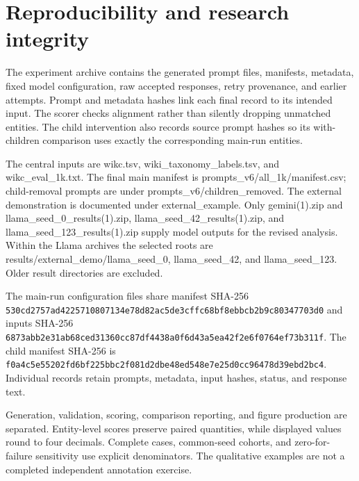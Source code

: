 \chapter{Reproducibility and research integrity}

The experiment archive contains the generated prompt files, manifests, metadata, fixed model configuration, raw accepted responses, retry provenance, and earlier attempts. Prompt and metadata hashes link each final record to its intended input. The scorer checks alignment rather than silently dropping unmatched entities. The child intervention also records source prompt hashes so its with-children comparison uses exactly the corresponding main-run entities.


The central inputs are wikc.tsv, wiki\_\allowbreak{}taxonomy\_\allowbreak{}labels.tsv, and wikc\_\allowbreak{}eval\_\allowbreak{}1k.txt. The final main manifest is prompts\_\allowbreak{}v6/all\_\allowbreak{}1k/manifest.csv; child-removal prompts are under prompts\_\allowbreak{}v6/children\_\allowbreak{}removed. The external demonstration is documented under external\_\allowbreak{}example. Only gemini(1).zip and llama\_\allowbreak{}seed\_\allowbreak{}0\_\allowbreak{}results(1).zip, llama\_\allowbreak{}seed\_\allowbreak{}42\_\allowbreak{}results(1).zip, and llama\_\allowbreak{}seed\_\allowbreak{}123\_\allowbreak{}results(1).zip supply model outputs for the revised analysis. Within the Llama archives the selected roots are results/external\_\allowbreak{}demo/llama\_\allowbreak{}seed\_\allowbreak{}0, llama\_\allowbreak{}seed\_\allowbreak{}42, and llama\_\allowbreak{}seed\_\allowbreak{}123. Older result directories are excluded.


{\small The main-run configuration files share manifest SHA-256 \nolinkurl{530cd2757ad4225710807134e78d82ac5de3cffc68bf8ebbcb2b9c80347703d0} and inputs SHA-256 \nolinkurl{6873abb2e31ab68ced31360cc87df4438a0f6d43a5ea42f2e6f0764ef73b311f}. The child manifest SHA-256 is \nolinkurl{f0a4c5e55202fd6bf225bbc2f081d2dbe48ed548e7e25d0cc96478d39ebd2bc4}. Individual records retain prompts, metadata, input hashes, status, and response text.\par}


Generation, validation, scoring, comparison reporting, and figure production are separated. Entity-level scores preserve paired quantities, while displayed values round to four decimals. Complete cases, common-seed cohorts, and zero-for-failure sensitivity use explicit denominators. The qualitative examples are not a completed independent annotation exercise.


